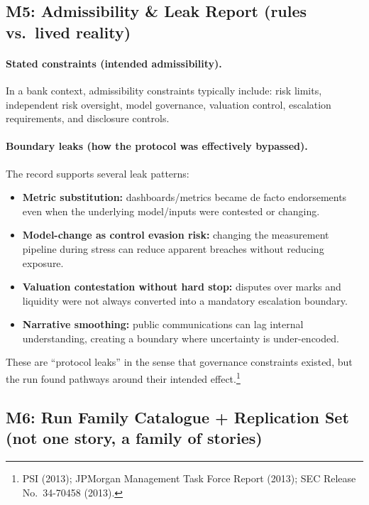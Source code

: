 \subsection{M5: Admissibility \& Leak Report (rules vs.\ lived reality)}
\label{subsec:lw-m5}

\paragraph{Stated constraints (intended admissibility).}
In a bank context, admissibility constraints typically include: risk limits, independent risk oversight, model governance, valuation control, escalation requirements, and disclosure controls.

\paragraph{Boundary leaks (how the protocol was effectively bypassed).}
The record supports several leak patterns:
\begin{itemize}
\item \textbf{Metric substitution:} dashboards/metrics became de facto endorsements even when the underlying model/inputs were contested or changing.
\item \textbf{Model-change as control evasion risk:} changing the measurement pipeline during stress can reduce apparent breaches without reducing exposure.
\item \textbf{Valuation contestation without hard stop:} disputes over marks and liquidity were not always converted into a mandatory escalation boundary.
\item \textbf{Narrative smoothing:} public communications can lag internal understanding, creating a boundary where uncertainty is under-encoded.
\end{itemize}
These are “protocol leaks” in the sense that governance constraints existed, but the run found pathways around their intended effect.\footnote{PSI (2013); JPMorgan Management Task Force Report (2013); SEC Release No.\ 34-70458 (2013).}

\subsection{M6: Run Family Catalogue + Replication Set (not one story, a family of stories)}
\label{subsec:lw-m6}

